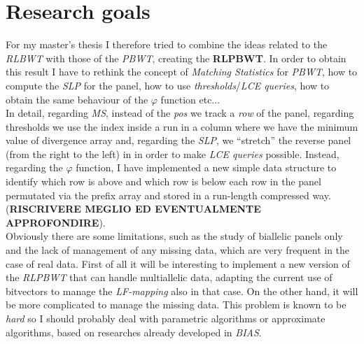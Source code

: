 \documentclass[a4paper,11pt, oneside]{article}
\begin{document}
\section*{Research goals}
For my master's thesis  I therefore tried to combine the ideas related to the
\textit{RLBWT} with those of the \textit{PBWT}, creating the \textbf{RLPBWT}. In
order to obtain this result I have to rethink the concept of \textit{Matching
  Statistics} for \textit{PBWT}, how to compute the \textit{SLP} for the panel,
how to use \textit{thresholds}/\textit{LCE queries}, how to obtain the same
behaviour of the $\varphi$ function etc$\ldots$\\
In detail, regarding \textit{MS}, instead of the \textit{pos} we track a
\textit{row} of the panel, regarding thresholds we use the index inside a run in
a column where we have the minimum value of divergence array and, regarding the
\textit{SLP}, we ``stretch'' the reverse panel (from the right to the left) in
in order to make \textit{LCE queries} possible. Instead, regarding the $\varphi$
function, I have implemented a new simple data structure to identify which row
is above and which row is below each row in the panel permutated via the
prefix array and stored in a run-length compressed way. (\textbf{RISCRIVERE
  MEGLIO ED EVENTUALMENTE APPROFONDIRE}).\\
Obviously there are some limitations, such as the study of biallelic panels
only and the lack of management of any missing data, which are very frequent in
the case of real data. First of all it will be interesting to implement a new
version of the \textit{RLPBWT} that can handle multiallelic data, adapting the
current use of bitvectors to manage the \textit{LF-mapping} also in that
case. On the other hand, it will be more complicated to manage the missing
data. This problem is known to be \textit{hard} so I should probably deal with
parametric algorithms or approximate algorithms, based on researches already
developed in \textit{BIAS}.


\end{document}
